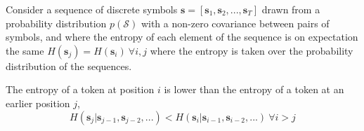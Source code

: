 %
\begin{lemma}
\label{lemma-sequence-directionality-entropy} 
%
Consider a sequence of discrete symbols $\bm{s}=\left[\bm{s}_1,\bm{s}_2,...,\bm{s}_T\right]$ drawn from a probability distribution $p(\mathcal{S})$ with a non-zero covariance between pairs of symbols, and where the entropy of each element of the sequence is on expectation the same $H(\bm{s}_j) = H(\bm{s}_i) \ \forall i,j $ where the entropy is taken over the probability distribution of the sequences.

The entropy of a token at position $i$ is lower than the entropy of a token at an earlier position $j$,
\begin{equation}
    H(\bm{s}_j|\bm{s}_{j-1},\bm{s}_{j-2},...) < H(\bm{s}_i|\bm{s}_{i-1},\bm{s}_{i-2},...) \ \forall i>j
\end{equation}
\end{lemma}
%
